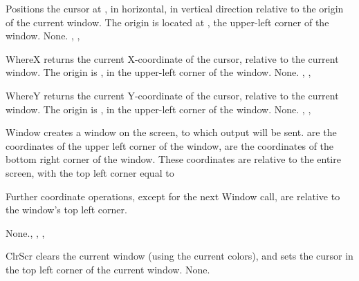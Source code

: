 { Positions the cursor at ,  in horizontal,  in
vertical direction relative to the origin of the current window. The origin
is located at , the upper-left corner of the window.
}
{None.}{ , ,  }



{
WhereX returns the current X-coordinate of the cursor, relative to the
current window. The origin is , in the upper-left corner of the
window.
}
{None.}{ , ,  }




{
WhereY returns the current Y-coordinate of the cursor, relative to the
current window. The origin is , in the upper-left corner of the
window.
}
{None.}{ , ,  }



{ Window creates a window on the screen, to which output will be sent.
 are the coordinates of the upper left corner of the window,
 are the coordinates of the bottom right corner of the window.
These coordinates are relative to the entire screen, with the top left
corner equal to 

Further coordinate operations, except for the next Window call,
are relative to the window's top left corner.
}
{None.}{, , , }




{ ClrScr clears the current window (using the current colors), 
and sets the cursor in the top left
corner of the current window.}
{None.}{  }





%
%

